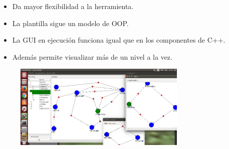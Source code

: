 \documentclass[notes,slidesec,a4]{seminar}
\begin{document}
\begin{hslide}

\begin{itemize}
\item Da mayor flexibilidad a la herramienta.
\item La plantilla sigue un modelo de OOP.
\item La GUI en ejecución funciona igual que en los componentes de C++.
\item Además permite visualizar más de un nivel a la vez.
\end{itemize}

\begin{center}
	\begin{figure}
		\includegraphics[height=4cm]{imgs/runtime-hierarchy.png}
	\end{figure}
\end{center}

\end{hslide}


\end{document}
